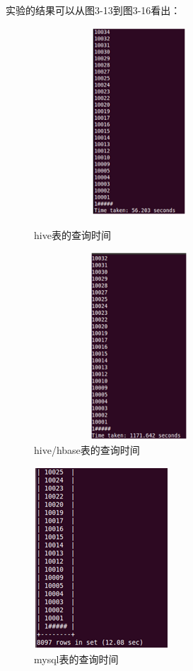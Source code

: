 实验的结果可以从图3-13到图3-16看出：
\begin{description}

\item
\begin{figure}[h]
\begin{minipage}[t]{0.4\linewidth}
\centering
\includegraphics[width=0.7\textwidth,height=7cm]{photo/djh3.png}
\caption{hive表的查询时间}
\end{minipage}
\hfill
\begin{minipage}[t]{0.4\linewidth}
\centering
\includegraphics[width=0.7\textwidth,height=7cm]{photo/djh4.png}
\caption{hive/hbase表的查询时间}
\end{minipage}
\end{figure}

\item
\begin{figure}[!ht]
\centering
\includegraphics[]{photo/djm3.png} 
\caption{mysql表的查询时间}
\end{figure} 


\end{description}
